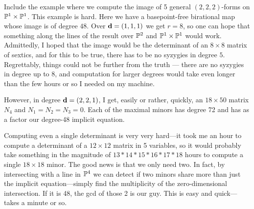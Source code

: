 \documentclass[fleqn,reqno]{amsart}
\numberwithin{first}{chapter}
\begin{document}
\begin{paragraf*}
Include the example where we compute the image of 5 general $(2,2,2)$-forms on $\mathbb{P}^1\times\mathbb{P}^1$.
This example is hard. Here we have a basepoint-free birational map whose image is of degree $48$.
Over $\mathbf d=(1,1,1)$ we get $r=8$, so one can hope that something along the lines of the result
over $\mathbb{P}^2$ and $\mathbb{P}^1\times\mathbb{P}^1$ would work. Admittedly, I hoped that the image would be the determinant
of an $8\times8$ matrix of sextics, and for this to be true, there has to be no syzygies in degree $5$.
Regrettably, things could not be further from the truth --- there are no syzygies in degree up to 8,
and computation for larger degrees would take even longer than the few hours or so I needed on my
machine.

However, in degree $\mathbf d=(2,2,1)$, I get, easily or rather, quickly,
an $18\times50$ matrix $N_4$ and $N_1=N_2=N_3=0$. Each of the maximal minors has degree 72 and has
as a factor our degree-48 implicit equation.

Computing even a single determinant is very very hard---it took me an hour to compute a determinant
of a $12\times12$ matrix in 5 variables, so it would probably take something in the magnitude of
$13*14*15*16*17*18$ hours to compute a single $18\times18$ minor. The good news is that we only need two.
In fact, by intersecting with a line in $\mathbb{P}^4$ we can detect if two minors share more than just
the implicit equation---simply find the multiplicity of the zero-dimensional intersection. If it is
48, the gcd of those 2 is our guy.
This is easy and quick---takes a minute or so.
\end{paragraf*}



\end{document}
